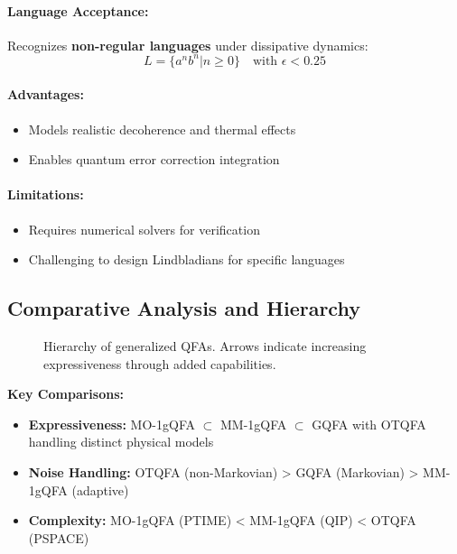 \paragraph{Language Acceptance:}
Recognizes \textbf{non-regular languages} under dissipative dynamics:
\[
L = \{a^nb^n | n \geq 0\} \quad \text{with } \epsilon < 0.25 
\]
\cite{hirvensalo2012quantum}

\paragraph{Advantages:}
\begin{itemize}
    \item Models realistic decoherence and thermal effects
    \item Enables quantum error correction integration
\end{itemize}

\paragraph{Limitations:}
\begin{itemize}
    \item Requires numerical solvers for verification
    \item Challenging to design Lindbladians for specific languages
\end{itemize}

\subsection*{Comparative Analysis and Hierarchy}
\begin{figure}[h]
\centering
{}
\caption{Hierarchy of generalized QFAs. Arrows indicate increasing expressiveness through added capabilities.}
\label{fig:gqfa-hierarchy}
\end{figure}

\textbf{Key Comparisons:}
\begin{itemize}
    \item \textbf{Expressiveness:} MO-1gQFA $\subset$ MM-1gQFA $\subset$ GQFA with OTQFA handling distinct physical models
    \item \textbf{Noise Handling:} OTQFA (non-Markovian) > GQFA (Markovian) > MM-1gQFA (adaptive)
    \item \textbf{Complexity:} MO-1gQFA (PTIME) < MM-1gQFA (QIP) < OTQFA (PSPACE)
\end{itemize}